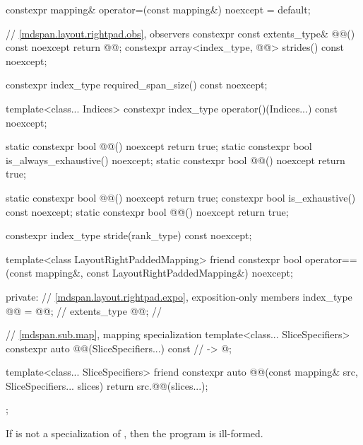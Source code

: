 \begin{codeblock}
{{    constexpr mapping& operator=(const mapping&) noexcept = default;

    // \ref{mdspan.layout.rightpad.obs}, observers
    constexpr const extents_type& @@() const noexcept { return @@; }
    constexpr array<index_type, @@> strides() const noexcept;

    constexpr index_type required_span_size() const noexcept;

    template<class... Indices>
      constexpr index_type operator()(Indices...) const noexcept;

    static constexpr bool @@() noexcept { return true; }
    static constexpr bool is_always_exhaustive() noexcept;
    static constexpr bool @@() noexcept { return true; }

    static constexpr bool @@() noexcept { return true; }
    constexpr bool is_exhaustive() const noexcept;
    static constexpr bool @@() noexcept { return true; }

    constexpr index_type stride(rank_type) const noexcept;

    template<class LayoutRightPaddedMapping>
      friend constexpr bool operator==(const mapping&, const LayoutRightPaddedMapping&) noexcept;

  private:
    // \ref{mdspan.layout.rightpad.expo}, exposition-only members
    index_type @@ = @@;                         // \expos
    extents_type @@{};                                               // \expos

    // \ref{mdspan.sub.map},  mapping specialization
    template<class... SliceSpecifiers>
      constexpr auto @@(SliceSpecifiers...) const     // \expos
        -> @\seebelow@;

    template<class... SliceSpecifiers>
      friend constexpr auto @@(const mapping& src, SliceSpecifiers... slices) {
      return src.@@(slices...);
    }
  };
}
\end{codeblock}

\pnum
If  is not a specialization of ,
then the program is ill-formed.

